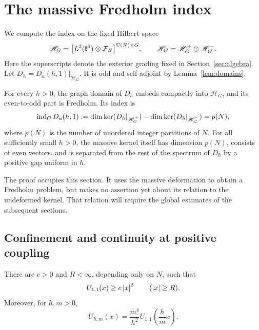 \section{The massive Fredholm index}
\label{sec:massive-index}

We compute the index on the fixed Hilbert space
\[
 \mathscr H_G=\bigl[L^2(\mathfrak k^9)\otimes\mathcal F_N\bigr]^{\operatorname{U}(N)\times G},
 \qquad
 \mathscr H_G=\mathscr H_G^+\oplus\mathscr H_G^-.
\]
Here the superscripts denote the exterior grading fixed in
Section~\ref{sec:algebra}. Let \(D_h=D_u(h,1)|_{\mathscr H_G}\).
It is odd and self-adjoint by Lemma~\ref{lem:domains}.

\begin{samepage}
\begin{proposition}
\label{prop:massive-index}
For every \(h>0\), the graph domain of \(D_h\) embeds compactly into
\(\mathscr H_G\), and its even-to-odd part is Fredholm. Its index is
\begin{equation}
\label{eq:massive-index}
 \operatorname{ind}_G D_u(h,1)
 :=\dim\operatorname{ker}(D_h|_{\mathscr H_G^+})
   -\dim\operatorname{ker}(D_h|_{\mathscr H_G^-})=p(N),
\end{equation}
where \(p(N)\) is the number of unordered integer partitions of
\(N\). For all sufficiently small \(h>0\), the massive kernel itself
has dimension \(p(N)\), consists of even vectors, and is separated
from the rest of the spectrum of \(D_h\) by a positive gap uniform
in \(h\).
\end{proposition}
\end{samepage}

The proof occupies this section. It uses the massive deformation to
obtain a Fredholm problem, but makes no assertion yet about its
relation to the undeformed kernel. That relation will require the
global estimates of the subsequent sections.

\subsection{Confinement and continuity at positive coupling}

\begin{lemma}
\label{lem:massive-potential}
There are \(c>0\) and \(R<\infty\), depending only on \(N\), such
that
\begin{equation}
\label{mass:potential-infinity}
 U_{1,1}(x)\geq c\left\lvert x\right\rvert^2\qquad(\left\lvert x\right\rvert\geq R).
\end{equation}
Moreover, for \(h,m>0\),
\begin{equation}
\label{mass:potential-scaling}
 U_{h,m}(x)=\frac{m^4}{h^2}
 U_{1,1}\left(\frac hm x\right).
\end{equation}
\end{lemma}

